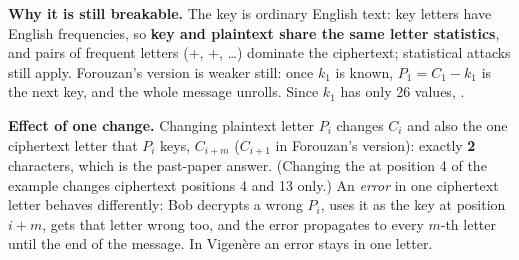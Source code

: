 \textbf{Why it is still breakable.} The key is ordinary English text: key letters have English frequencies, so \textbf{key and plaintext share the same letter statistics}, and pairs of frequent letters (+, +, \dots) dominate the ciphertext; statistical attacks still apply. Forouzan's version is weaker still: once $k_1$ is known, $P_1 = C_1 - k_1$ is the next key, and the whole message unrolls. Since $k_1$ has only 26 values, .

\textbf{Effect of one change.} Changing plaintext letter $P_i$ changes $C_i$ and also the one ciphertext letter that $P_i$ keys, $C_{i+m}$ ($C_{i+1}$ in Forouzan's version): exactly \textbf{2} characters, which is the past-paper answer. (Changing the  at position 4 of the example changes ciphertext positions 4 and 13 only.) An \emph{error} in one ciphertext letter behaves differently: Bob decrypts a wrong $P_i$, uses it as the key at position $i + m$, gets that letter wrong too, and the error propagates to every $m$-th letter until the end of the message. In Vigen\`ere an error stays in one letter.

